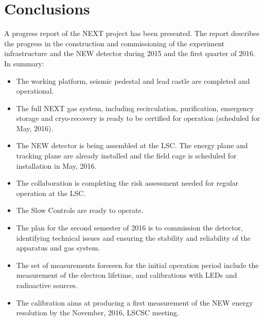\section{Conclusions}
\label{sec.conclu}

A progress report of the NEXT project has been presented. The report describes the progress in the construction and commissioning of the experiment infrastructure and the NEW detector during 2015 and the first quarter of 2016. In summary:

\begin{itemize}
\item The working platform, seismic pedestal and lead castle are completed and operational.
\item The full NEXT gas system, including recirculation, purification, emergency storage and cryo-recovery is ready to be certified for operation (scheduled for May, 2016).
\item The NEW detector is being assembled at the LSC. The energy plane and tracking plane are already installed and the field cage is scheduled for installation in May, 2016.
\item The collaboration is completing the risk assessment needed for regular operation at the LSC. 
\item The Slow Controls are ready to operate. 
\item The plan for the second semester of 2016 is to commission the detector, identifying technical issues and ensuring the stability and reliability of the apparatus and gas system. 
\item The set of measurements foreseen for the initial operation period include the measurement of the electron lifetime, and calibrations with LEDs and radioactive sources. 
\item The calibration aims at producing a first measurement of the NEW energy resolution by the November, 2016, LSCSC meeting. 
\end{itemize}

